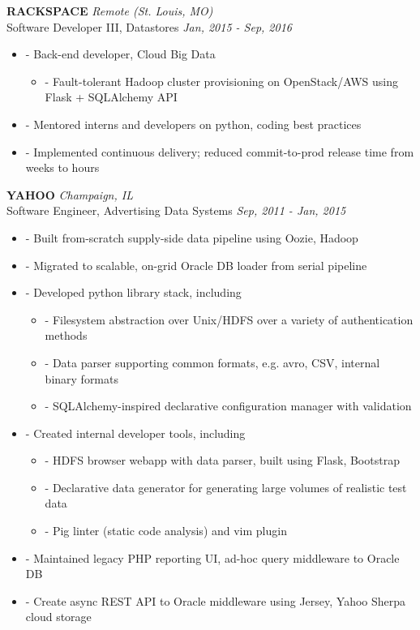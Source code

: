 \documentclass[a4paper,11pt]{article}
\newenvironment{pitemize}{
\begin{itemize}
\setlength{\itemsep}{.01in}
\setlength{\parskip}{.01in}
}
{\end{itemize}}
\begin{document}
\vspace{0.2in}
\textbf{RACKSPACE} \hfill \textit{Remote (St. Louis, MO)} \\
Software Developer III, Datastores \hfill \textit{Jan, 2015 - Sep, 2016}
\begin{pitemize}
    \item[-]Back-end developer, Cloud Big Data
    \begin{pitemize}
        \item[-]Fault-tolerant Hadoop cluster provisioning on OpenStack/AWS using Flask + SQLAlchemy API
    \end{pitemize}
\item[-]Mentored interns and developers on python, coding best practices
\item[-]Implemented continuous delivery; reduced commit-to-prod release time from weeks to hours
\end{pitemize}

\vspace{0.2in}
\textbf{YAHOO} \hfill \textit{Champaign, IL} \\
Software Engineer, Advertising Data Systems \hfill \textit{Sep, 2011 - Jan, 2015}
\begin{pitemize}
    \item[-]Built from-scratch supply-side data pipeline using Oozie, Hadoop
    \item[-]Migrated to scalable, on-grid Oracle DB loader from serial pipeline
    \item[-]Developed python library stack, including
    \begin{pitemize}
        \item[-]Filesystem abstraction over Unix/HDFS over a variety of authentication methods
        \item[-]Data parser supporting common formats, e.g. avro, CSV, internal binary formats
        \item[-]SQLAlchemy-inspired declarative configuration manager with validation
    \end{pitemize}
    \item[-]Created internal developer tools, including
    \begin{pitemize}
        \item[-]HDFS browser webapp with data parser, built using Flask, Bootstrap
        \item[-]Declarative data generator for generating large volumes of realistic test data
        \item[-]Pig linter (static code analysis) and vim plugin
    \end{pitemize}
    \item[-]Maintained legacy PHP reporting UI, ad-hoc query middleware to Oracle DB
    \item[-]Create async REST API to Oracle middleware using Jersey, Yahoo Sherpa cloud storage
\end{pitemize}
\end{document}
